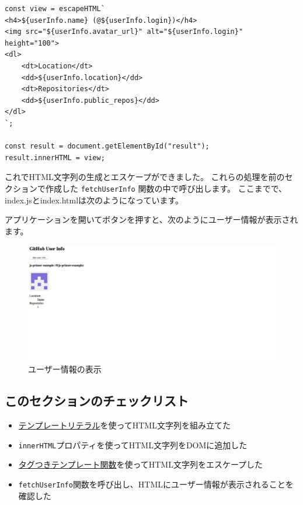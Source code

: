 \begin{lstlisting}
const view = escapeHTML`
<h4>${userInfo.name} (@${userInfo.login})</h4>
<img src="${userInfo.avatar_url}" alt="${userInfo.login}" height="100">
<dl>
    <dt>Location</dt>
    <dd>${userInfo.location}</dd>
    <dt>Repositories</dt>
    <dd>${userInfo.public_repos}</dd>
</dl>
`;

const result = document.getElementById("result");
result.innerHTML = view;
\end{lstlisting}

これでHTML文字列の生成とエスケープができました。
これらの処理を前のセクションで作成した
\texttt{fetchUserInfo} 関数の中で呼び出します。
ここまでで、index.jsとindex.htmlは次のようになっています。





アプリケーションを開いてボタンを押すと、次のようにユーザー情報が表示されます。

\begin{figure}[h]
\centering
\includegraphics[width=140mm]{fig/fig-4.pdf}
\caption{ユーザー情報の表示}
\end{figure}

\hypertarget{section-checklist}{%
\subsection{このセクションのチェックリスト}\label{section-checklist}}

\begin{itemize}
\item
  \hyperlink{create}{テンプレートリテラル}を使ってHTML文字列を組み立てた
\item
  \texttt{innerHTML}プロパティを使ってHTML文字列をDOMに追加した
\item
  \hyperlink{tagged-template-function}{タグつきテンプレート関数}を使ってHTML文字列をエスケープした
\item
  \texttt{fetchUserInfo}関数を呼び出し、HTMLにユーザー情報が表示されることを確認した
\end{itemize}

